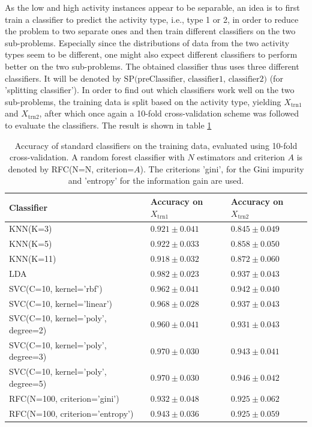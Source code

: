\documentclass [a4paper] {report}
\begin{document}
	\noindent
	As the low and high activity instances appear to be separable, an idea is to first train a classifier to predict the activity type, i.e., type 1 or 2, in order to reduce the problem to two separate ones and then train different classifiers on the two sub-problems. Especially since the distributions of data from the two activity types seem to be different, one might also expect different classifiers to perform better on the two sub-problems. The obtained classifier thus uses three different classifiers. It will be denoted by $\text{SP(preClassifier, classifier1, classifier2})$ (for 'splitting classifier').
	In order to find out which classifiers work well on the two sub-problems, the training data is split based on the activity type, yielding $X_{\text{trn1}}$ and $X_{\text{trn2}}$, after which once again a 10-fold cross-validation scheme was followed to evaluate the classifiers. The result is shown in table \ref{tab:basic_separated}
	
	\begin{table}[H]
		\centering
		\caption{Accuracy of standard classifiers on the training data, evaluated using 10-fold cross-validation. A random forest classifier with $N$ estimators and criterion $A$ is denoted by RFC(N=N, criterion=$A$). The criterions 'gini', for the Gini impurity and 'entropy' for the information gain are used.}
		\label{tab:basic_separated}
		\begin{tabular}{l|l|l}
			Classifier 							& Accuracy on $X_{\text{trn1}}$ & Accuracy on $X_{\text{trn2}}$ \\ \hline
			KNN(K=3)						 	& $0.921 \pm 0.041 $			& $0.845 \pm 0.049 $\\
			KNN(K=5) 							& $0.922 \pm 0.033 $			& $0.858 \pm 0.050 $\\
			KNN(K=11) 							& $0.918 \pm 0.032 $			& $0.872 \pm 0.060 $\\
			LDA 								& $0.982 \pm 0.023 $			& $0.937 \pm 0.043 $\\
			SVC(C=10, kernel='rbf') 			& $0.962 \pm 0.041 $			& $0.942 \pm 0.040 $\\
			SVC(C=10, kernel='linear') 			& $0.968 \pm 0.028 $			& $0.937 \pm 0.043 $\\
			SVC(C=10, kernel='poly', degree=2) 	& $0.960 \pm 0.041 $			& $0.931 \pm 0.043 $\\
			SVC(C=10, kernel='poly', degree=3) 	& $0.970 \pm 0.030 $			& $0.943 \pm 0.041 $\\
			SVC(C=10, kernel='poly', degree=5) 	& $0.970 \pm 0.030 $			& $0.946 \pm 0.042 $\\
			RFC(N=100, criterion='gini')		& $0.932 \pm 0.048 $			& $0.925 \pm 0.062 $\\
			RFC(N=100, criterion='entropy')		& $0.943 \pm 0.036 $			& $0.925 \pm 0.059 $\\
		\end{tabular}		
	\end{table}
	
\end{document}
